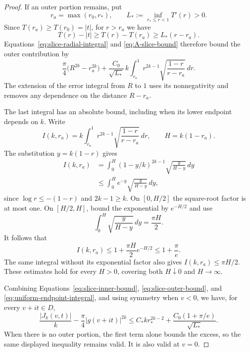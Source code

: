\begin{proof}
If an outer portion remains, put
\[
 r_a=\max(r_0,r_*),\qquad
 L_*:=\inf_{r_*\le r<1}T'(r)>0.
\]
Since \(T(r_a)\ge T(r_0)=|t|\), for \(r>r_a\) we have
\begin{equation}\label{eq:gap-tail-bound}
 T(r)-|t|\ge T(r)-T(r_a)\ge L_*(r-r_a).
\end{equation}
Equations~\eqref{eq:slice-radial-integral} and
\eqref{eq:A-slice-bound} therefore bound the outer contribution by
\begin{equation}\label{eq:slice-outer-bound}
 \frac{\pi}{4}\bigl(R^{2k}-r_a^{2k}\bigr)
  +\frac{C_0}{\sqrt{L_*}}\,
       k\int_{r_a}^{1}r^{2k-1}
                 \sqrt{\frac{1-r}{r-r_a}}\,dr.
\end{equation}
The extension of the error integral from \(R\) to \(1\) uses its
nonnegativity and removes any dependence on the distance \(R-r_a\).

The last integral has an absolute bound, including when its lower
endpoint depends on \(k\).  Write
\[
 I(k,r_a)=k\int_{r_a}^{1}r^{2k-1}
                    \sqrt{\frac{1-r}{r-r_a}}\,dr,
 \qquad H=k(1-r_a).
\]
The substitution \(y=k(1-r)\) gives
\begin{align*}
 I(k,r_a)
   &=\int_0^H(1-y/k)^{2k-1}\sqrt{\frac{y}{H-y}}\,dy\\
   &\le\int_0^H e^{-y}\sqrt{\frac{y}{H-y}}\,dy,
\end{align*}
since \(\log r\le-(1-r)\) and \(2k-1\ge k\).
On \([0,H/2]\) the square-root factor is at most one.  On
\([H/2,H]\), bound the exponential by \(e^{-H/2}\) and use
\[
 \int_0^H\sqrt{\frac{y}{H-y}}\,dy=\frac{\pi H}{2}.
\]
It follows that
\begin{equation}\label{eq:uniform-endpoint-integral}
 I(k,r_a)\le 1+\frac{\pi H}{2}e^{-H/2}
           \le 1+\frac{\pi}{e}.
\end{equation}
The same integral without its exponential factor also gives
\(I(k,r_a)\le\pi H/2\).  These estimates hold for every \(H>0\),
covering both \(H\downarrow0\) and \(H\to\infty\).

Combining Equations~\eqref{eq:slice-inner-bound},
\eqref{eq:slice-outer-bound}, and
\eqref{eq:uniform-endpoint-integral}, and using symmetry when \(v<0\),
we have, for every \(v+it\in D\),
\begin{equation}\label{eq:slice-uniform-error-bound}
 \frac{|J_k(v,t)|}{k}-\frac{\pi}{4}|g(v+it)|^{2k}
   \le C_*k r_*^{2k-2}
          +\frac{C_0(1+\pi/e)}{\sqrt{L_*}}.
\end{equation}
When there is no outer portion, the first term alone bounds the excess,
so the same displayed inequality remains valid.  It is also valid at
\(v=0\).


\end{proof}
